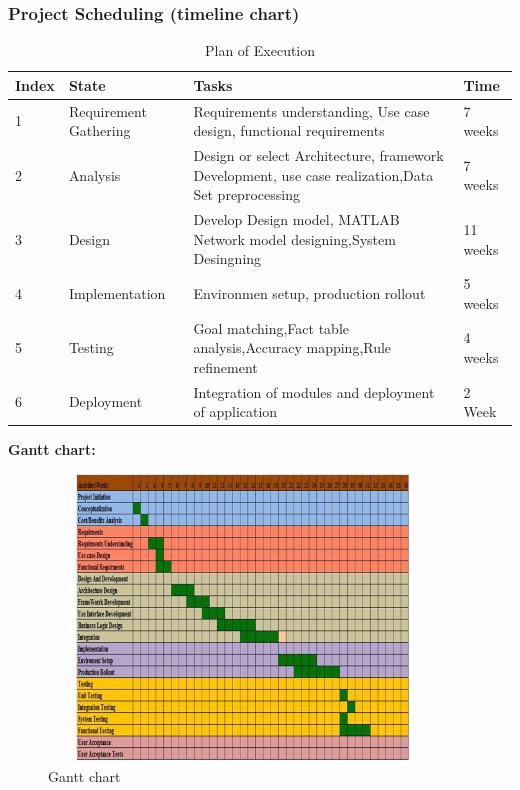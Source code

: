 \documentclass[a4paper,14pt,onecolumn]{article}
\begin{document}
\subsubsection{Project Scheduling (timeline chart) }
\begin{table}[hbp]
 \begin{center}
    \begin{tabular}{ | l | p{5cm} | p{5cm} | l |}
    \hline
     Index  &	State	 & Tasks &	Time  \\ \hline
    1	& Requirement Gathering	& Requirements understanding, Use case design, functional requirements &	7 weeks\\ \hline
2	& Analysis  &	Design or select Architecture, framework Development, use case realization,Data Set preprocessing	& 7 weeks\\ \hline
3	& Design &	Develop Design model, MATLAB Network model designing,System Desingning &	11 weeks\\ \hline
4 	& Implementation	& Environmen setup, production rollout	  & 5 weeks\\ \hline
5	& Testing	& Goal matching,Fact table analysis,Accuracy mapping,Rule refinement	&   4 weeks\\ \hline
6	&  Deployment &	Integration of modules and deployment of application	 &  2 Week\\ \hline

    \hline
    \end{tabular}
   \caption{Plan of Execution}
\end{center}
\end{table} 

\textbf{Gantt chart:}\\
\begin{figure}[h!]
\begin{center}
\includegraphics[height=3in,width=4in]
{gantt.jpg}  
\caption{Gantt chart}
\end{center}
\end{figure}  
\end{document}
